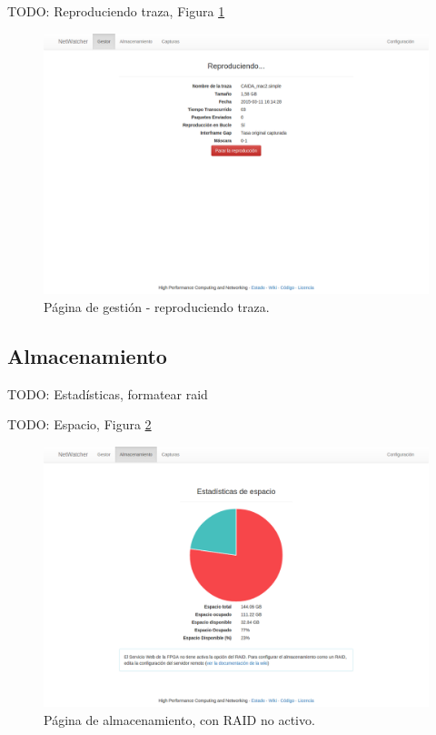 TODO: Reproduciendo traza, Figura \ref{fig:captura:gestionreproduciendo}
\begin{figure}[H]
  \centering
  \includegraphics[width=\textwidth,clip=true]{graphics/capturas/gestor_reproduccion}
  \caption{Página de gestión - reproduciendo \gls{traza}.}
  \label{fig:captura:gestionreproduciendo}
\end{figure}


\subsection{Almacenamiento\label{extra:manual:almacenamiento}}
TODO: Estadísticas, formatear raid

TODO: Espacio, Figura \ref{fig:captura:espacio}
\begin{figure}[H]
  \centering
  \includegraphics[width=\textwidth,clip=true]{graphics/capturas/almacenamiento_espacio}
  \caption{Página de almacenamiento, con \gls{RAID} no activo.}
  \label{fig:captura:espacio}
\end{figure}

